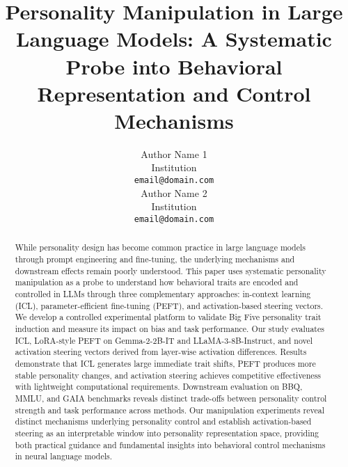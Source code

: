 \documentclass[11pt]{article}
\title{Personality Manipulation in Large Language Models: A Systematic Probe into Behavioral Representation and Control Mechanisms}
\author{Author Name 1 \\
  Institution \\
  \texttt{email@domain.com} \\\And
  Author Name 2 \\
  Institution \\
  \texttt{email@domain.com} \\}
\begin{document}
\maketitle
\begin{abstract}
While personality design has become common practice in large language models through prompt engineering and fine-tuning, the underlying mechanisms and downstream effects remain poorly understood. This paper uses systematic personality manipulation as a probe to understand how behavioral traits are encoded and controlled in LLMs through three complementary approaches: in-context learning (ICL), parameter-efficient fine-tuning (PEFT), and activation-based steering vectors. We develop a controlled experimental platform to validate Big Five personality trait induction and measure its impact on bias and task performance. Our study evaluates ICL, LoRA-style PEFT on Gemma-2-2B-IT and LLaMA-3-8B-Instruct, and novel activation steering vectors derived from layer-wise activation differences. Results demonstrate that ICL generates large immediate trait shifts, PEFT produces more stable personality changes, and activation steering achieves competitive effectiveness with lightweight computational requirements. Downstream evaluation on BBQ, MMLU, and GAIA benchmarks reveals distinct trade-offs between personality control strength and task performance across methods. Our manipulation experiments reveal distinct mechanisms underlying personality control and establish activation-based steering as an interpretable window into personality representation space, providing both practical guidance and fundamental insights into behavioral control mechanisms in neural language models.
\end{abstract}







\appendix













\end{document}
